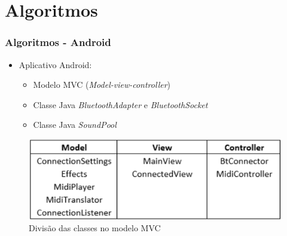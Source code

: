\documentclass[hyperref={pdfpagelabels=false}]{beamer}
\begin{document}
        \section{Algoritmos}

            \begin{frame}\frametitle{Algoritmos - Android}

                     \begin{itemize}
                      \item Aplicativo Android:
                        \begin{itemize}
                          \item Modelo MVC (\textit{Model-view-controller})
                          \item Classe Java \textit{BluetoothAdapter} e \textit{BluetoothSocket}
                          \item Classe Java \textit{SoundPool}
                        \end{itemize}
                    \end{itemize}

                    \begin{figure}[H]
                        \centering
                        \includegraphics[scale=0.6]{Imagens/mvc.png}
                        \caption[Divisão das classes no modelo MVC]{Divisão das classes no modelo MVC}
                    \end{figure}

            \end{frame}
\end{document}
